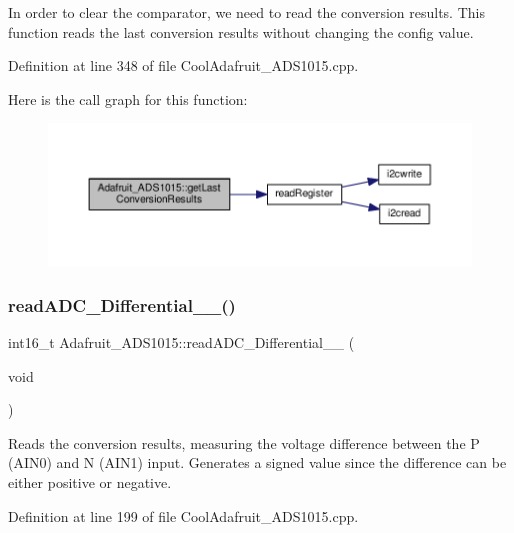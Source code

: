 In order to clear the comparator, we need to read the conversion results. This function reads the last conversion results without changing the config value. 



Definition at line 348 of file Cool\+Adafruit\+\_\+\+A\+D\+S1015.\+cpp.

Here is the call graph for this function\+:\nopagebreak
\begin{figure}[H]
\begin{center}
\leavevmode
\includegraphics[width=350pt]{class_adafruit___a_d_s1015_ad8f36d80847020778425107f6451a8c2_cgraph}
\end{center}
\end{figure}
\mbox{\label{class_adafruit___a_d_s1015_a56582333958e66efaccd3d4a8a47e3ff}} 
\subsubsection{\texorpdfstring{read\+A\+D\+C\+\_\+\+Differential\+\_\+\_()}{readADC\_Differential\_0\_1()}}
{\footnotesize\ttfamily int16\+\_\+t Adafruit\+\_\+\+A\+D\+S1015\+::read\+A\+D\+C\+\_\+\+Differential\+\_\+\_ (\begin{DoxyParamCaption}\item[{void}]{ }\end{DoxyParamCaption})}



Reads the conversion results, measuring the voltage difference between the P (A\+I\+N0) and N (A\+I\+N1) input. Generates a signed value since the difference can be either positive or negative. 



Definition at line 199 of file Cool\+Adafruit\+\_\+\+A\+D\+S1015.\+cpp.

